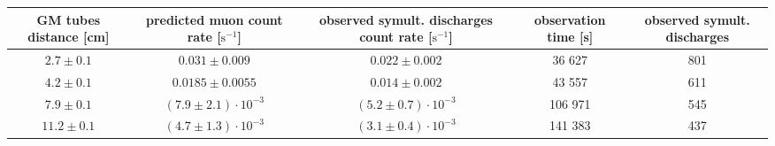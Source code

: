 \documentclass[main.tex]{subfiles}
\begin{document}
\begin{tabulary}{\linewidth}{CCCCC}
\hline
 GM tubes distance [cm] & predicted muon count rate [$\text{s}^{-1}$]& observed symult. discharges count rate [$\text{s}^{-1}$]& observation time [s] & observed symult. discharges \\ 
 \hline\hline
 $2.7\pm0.1$ & $0.031\pm0.009$ & $0.022\pm0.002$ & 36 627 & 801\\
 $4.2\pm0.1$ & $0.0185\pm0.0055$ & $0.014\pm0.002$& 43 557 & 611\\
 $7.9\pm0.1$& $(7.9\pm2.1)\cdot 10^{-3}$ & $(5.2\pm0.7)\cdot 10^{-3}$ &106 971&545\\
$11.2\pm0.1$&$(4.7\pm 1.3)\cdot 10^{-3}$&$(3.1\pm 0.4)\cdot 10^{-3}$&141 383&437\\
 \hline
\end{tabulary} 
\end{document}
